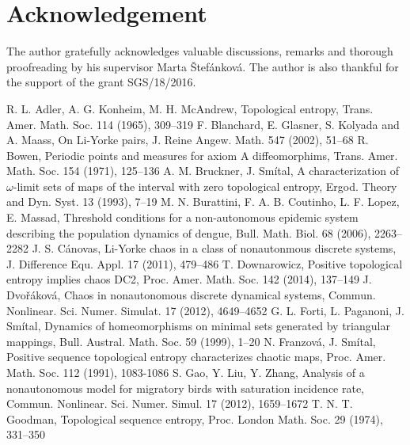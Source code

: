 \documentclass{amsart}
\begin{document}
\section{Acknowledgement}
The author gratefully acknowledges valuable discussions, remarks and thorough proofreading by his supervisor Marta \v{S}tef\'{a}nkov\'{a}. The author is also thankful for the support of the grant SGS/18/2016.

\begin{thebibliography}{19}
	R. L. Adler, A. G. Konheim, M. H. McAndrew,
	Topological entropy,
	Trans. Amer. Math. Soc. 114 (1965),
	309--319
	F. Blanchard, E. Glasner, S. Kolyada and A. Maass,
	On Li-Yorke pairs,
	J. Reine Angew. Math. 547 (2002),
	51--68
	R. Bowen,
	Periodic points and measures for axiom A diffeomorphims,
	Trans. Amer. Math. Soc. 154 (1971),
	125--136
	A. M. Bruckner, J. Sm\'{i}tal,
	A characterization of $\omega$-limit sets of maps of the interval with zero topological entropy,
	Ergod. Theory and Dyn. Syst. 13 (1993),
	7--19
	M. N. Burattini, F. A. B. Coutinho, L. F. Lopez, E. Massad,
	Threshold conditions for a non-autonomous epidemic system describing the population dynamics of dengue,
	Bull. Math. Biol. 68 (2006),
	2263--2282
	J. S. C\'{a}novas,
	Li-Yorke chaos in a class of nonautonmous discrete systems,
	J. Difference Equ. Appl. 17 (2011),
	479--486
	T. Downarowicz,
	Positive topological entropy implies chaos DC2,
	Proc. Amer. Math. Soc. 142 (2014),
	137--149
	J. Dvo\v{r}\'{a}kov\'{a},
	Chaos in nonautonomous discrete dynamical systems,
	Commun. Nonlinear. Sci. Numer. Simulat. 17 (2012),
	4649--4652
	G. L. Forti, L. Paganoni, J. Sm\'{i}tal,
	Dynamics of homeomorphisms on minimal sets generated by triangular mappings,
	Bull. Austral. Math. Soc. 59 (1999),
	1--20
	N. Franzov\'{a}, J. Sm\'{i}tal,
	Positive sequence topological entropy characterizes chaotic maps,
	Proc. Amer. Math. Soc. 112 (1991),
	1083-1086
	S. Gao, Y. Liu, Y. Zhang,
	Analysis of a nonautonomous model for migratory birds with saturation incidence rate,
	Commun. Nonlinear. Sci. Numer. Simul. 17 (2012),
	1659--1672
	T. N. T. Goodman,
	Topological sequence entropy,
	Proc. London Math. Soc. 29 (1974),
	331--350

\end{thebibliography}
\end{document}
